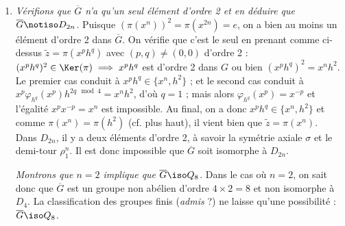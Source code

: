 \begin{enumerate}[resume]
     \emph{Déterminons l'ordre de $Z\left(\overline{G}\right)$ et montrons que $\overline{G}$ n'est pas abélien}. La preuve ci-dessus a établi que $Z\left(\overline{G}\right) = \{\pi(e), \pi(x^n), \pi(h^2), \pi(x^nh^2)\}$ donc $\card{Z\left(\overline{G}\right)} = 4$.\\
     Puisque $n\geq 2$, on a donc $\card{\overline{G}} = 4n > \card{Z\left(\overline{G}\right)}$, ce qui suffit à conclure que $\overline{G}$ n'est pas abélien.\smallskip

    \emph{Montrons que $\grq{\overline{G}}{Z(\overline{G})} \iso \grq{G}{Z(G)}$}. On applique le troisième théorème d'isomorphisme 4.36 : on a bien $K \subset Z(G)$ avec $K\normal G$ et $Z(G) \normal G$ donc ce théorème garantit que 
    $\grq{G}{Z(G)} \iso \grq{\grq{G}{K}}{\grq{Z(G)}{K}}$, ce qui est bien le résultat attendu.

    \item \emph{Vérifions que $\overline{G}$ n'a qu'un seul élément d'ordre 2 et en déduire que $\overline{G} \notiso D_{2n}$}. Puisque $\left(\pi(x^n)\right)^2 = \pi(x^{2n}) = e$, on a bien au moins un élément d'ordre 2 dans $\overline{G}$. On vérifie que c'est le seul en prenant comme ci-dessus $\tilde{z} = \pi(x^ph^q)$ avec $(p,q) \neq (0,0)$ d'ordre 2 : 
    $(x^ph^q)^2 \in \Ker(\pi) \implies x^ph^q$ est d'ordre 2 dans $G$ ou bien $(x^ph^q)^2 = x^nh^2$. Le premier cas conduit à $x^p h^q \in \{x^n, h^2\}$ ; et le second cas conduit à $x^{p} \varphi_{h^q}(x^p) h^{2q \mod 4} = x^nh^2$, d'où $q=1$ ; mais alors $\varphi_{h^q}(x^p)=x^{-p}$ et l'égalité $x^{p}x^{-p} = x^n$ est impossible. 
    Au final, on a donc $x^p h^q \in \{x^n, h^2\}$ et comme $\pi(x^n) = \pi(h^2)$ (cf. plus haut), il vient bien que $\tilde{z}  = \pi(x^n)$.\\
    Dans $D_{2n}$, il y a deux éléments d'ordre 2, à savoir la symétrie axiale $\sigma$ et le demi-tour $\rho_1^n$. Il est donc impossible que $\overline{G}$ soit isomorphe à $D_{2n}$.\smallskip

    \emph{Montrons que $n=2$ implique que $\overline{G} \iso Q_8$}. Dans le cas où $n=2$, on sait donc que $\overline{G}$ est un groupe non abélien d'ordre $4\times 2 = 8$ et non isomorphe à $D_4$. 
    La classification des groupes finis (\textit{admis} ?) ne laisse qu'une possibilité : $\overline{G} \iso Q_8$.


\end{enumerate}
